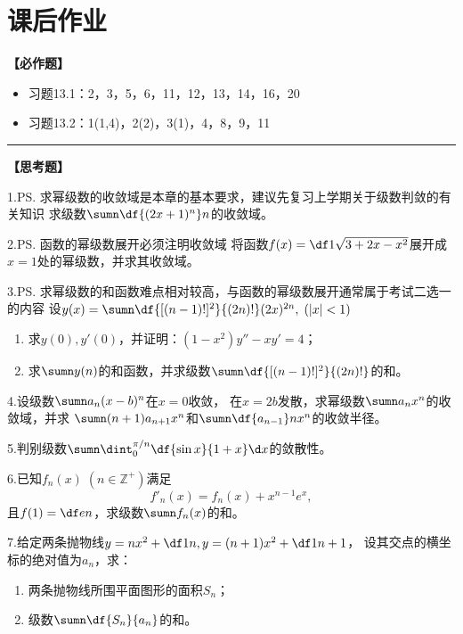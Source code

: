 \newpage

\section*{课后作业}

{\bf 【必作题】}

\begin{itemize}
  \setlength{\itemindent}{1cm}
  \item 习题13.1：2，3，5，6，11，12，13，14，16，20
  \item 习题13.2：1(1,4)，2(2)，3(1)，4，8，9，11
\end{itemize}


\bigskip

\hrule

\bigskip

{\bf 【思考题】}

1.\;\ps{求幂级数的收敛域是本章的基本要求，建议先复习上学期关于级数判敛的有关知识}
求级数$\sumn\df{(2x+1)^n}n$的收敛域。

2.\;\ps{函数的幂级数展开必须注明收敛域}
将函数$f(x)=\df1{\sqrt{3+2x-x^2}}$展开成$x=1$处的幂级数，并求其收敛域。

3.\;\ps{求幂级数的和函数难点相对较高，与函数的幂级数展开通常属于考试二选一的内容}
设$y(x)=\sumn\df{[(n-1)!]^2}{(2n)!}(2x)^{2n},\;(|x|<1)$
\begin{enumerate}[(1)]
  \setlength{\itemindent}{1cm}
  \item 求$y(0),y'(0)$，并证明：$(1-x^2)y''-xy'=4$；
  \item 求$\sumn y(n)$的和函数，并求级数$\sumn\df{[(n-1)!]^2}{(2n)!}$的和。
\end{enumerate}

4.\;设级数$\sumn a_n(x-b)^n$在$x=0$收敛，
在$x=2b$发散，求幂级数$\sumn a_nx^n$的收敛域，并求
$\sumn(n+1)a_{n+1}x^n$和$\sumn\df{a_{n-1}}nx^n$的收敛半径。

5.\;判别级数$\sumn\dint_0^{\pi/n}\df{\sin x}{1+x}\d x$的敛散性。

6.\;已知$f_n(x)\;(n\in\mathbb{Z}^+)$满足
$$f'_n(x)=f_n(x)+x^{n-1}e^x,$$
且$f(1)=\df en$，求级数$\sumn f_n(x)$的和。

7.\;给定两条抛物线$y=nx^2+\df1n,y=(n+1)x^2+\df1{n+1}$，
设其交点的横坐标的绝对值为$a_n$，求：
\begin{enumerate}[(1)]
  \setlength{\itemindent}{1cm}
  \item 两条抛物线所围平面图形的面积$S_n$；
  \item 级数$\sumn\df{S_n}{a_n}$的和。
\end{enumerate}

